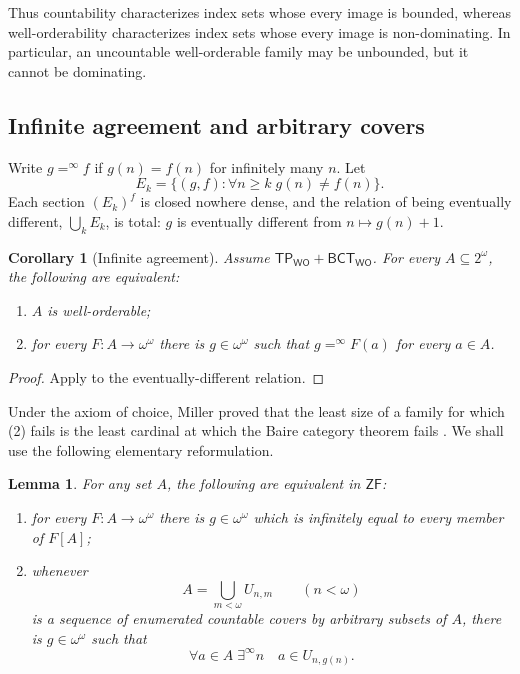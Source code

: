 \documentclass[11pt,reqno]{amsart}
\newcommand{\WO}{\mathsf{WO}}
\newcommand{\BCTWO}{\mathsf{BCT}_{\WO}}
\newcommand{\TP}{\mathsf{TP}_{\WO}}
\newcommand{\meq}{=^{\infty}}
\theoremstyle{plain}
\newtheorem{lemma}[lemma]{Lemma}
\newtheorem{corollary}[corollary]{Corollary}
\theoremstyle{definition}
\theoremstyle{remark}
\begin{document}
Thus countability characterizes index sets whose every image is bounded,
whereas well-orderability characterizes index sets whose every image is
non-dominating.  In particular, an uncountable well-orderable family may be
unbounded, but it cannot be dominating.

\subsection{Infinite agreement and arbitrary covers}

Write $g\meq f$ if $g(n)=f(n)$ for infinitely many $n$.  Let
\[
 E_k=\{(g,f):\forall n\geq k\;g(n)\neq f(n)\}.
\]
Each section $(E_k)^f$ is closed nowhere dense, and the relation of being
eventually different, $\bigcup_kE_k$, is total: $g$ is eventually different
from $n\mapsto g(n)+1$.

\begin{corollary}[Infinite agreement]\label{cor:agreement}
Assume $\TP+\BCTWO$.  For every $A\subseteq2^\omega$, the following are
equivalent:
\begin{enumerate}
\item $A$ is well-orderable;
\item for every $F:A\to\omega^\omega$ there is $g\in\omega^\omega$ such
that $g\meq F(a)$ for every $a\in A$.
\end{enumerate}
\end{corollary}

\begin{proof}
Apply  to the eventually-different relation.
\end{proof}

Under the axiom of choice, Miller proved that the least size of a family for
which (2) fails is the least cardinal at which the Baire category theorem
fails \cite{Miller1982}.  We shall use the following elementary reformulation.

\begin{lemma}\label{lem:cover-selection}
For any set $A$, the following are equivalent in $\mathsf{ZF}$:
\begin{enumerate}
\item for every $F:A\to\omega^\omega$ there is $g\in\omega^\omega$ which
is infinitely equal to every member of $F[A]$;
\item whenever
\[
 A=\bigcup_{m<\omega}U_{n,m}\qquad(n<\omega)
\]
is a sequence of enumerated countable covers by arbitrary subsets of $A$,
there is $g\in\omega^\omega$ such that
\[
 \forall a\in A\;\exists^\infty n\quad a\in U_{n,g(n)}.
\]
\end{enumerate}
\end{lemma}
\end{document}
